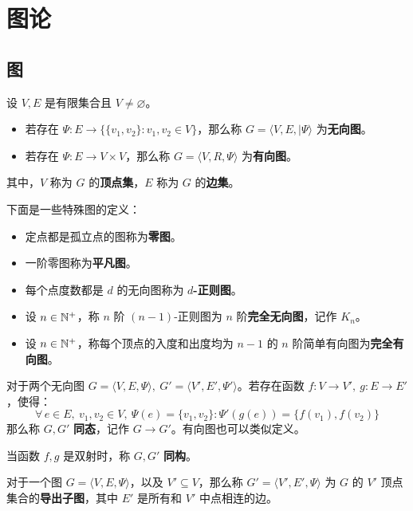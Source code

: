 \section{图论}

\subsection{图}

\begin{definition}[图]
    设 $V, E$ 是有限集合且 $V \neq \varnothing$。
    \begin{itemize}
        \item 若存在 $\Psi: E \to \{\{v_1, v_2\}: v_1, v_2 \in V\}$，那么称 $G = \langle V, E, |\Psi \rangle$ 为\textbf{无向图}。
        \item 若存在 $\Psi: E \to V \times V$，那么称 $G = \langle V, R, \Psi \rangle$ 为\textbf{有向图}。
    \end{itemize}
    其中，$V$ 称为 $G$ 的\textbf{顶点集}，$E$ 称为 $G$ 的\textbf{边集}。
\end{definition}

下面是一些特殊图的定义：

\begin{itemize}
    \item 定点都是孤立点的图称为\textbf{零图}。
    \item 一阶零图称为\textbf{平凡图}。
    \item 每个点度数都是 $d$ 的无向图称为 \textbf{$d$-正则图}。
    \item 设 $n \in \mathbb{N}^+$，称 $n$ 阶 $(n-1)$-正则图为 $n$ 阶\textbf{完全无向图}，记作 $K_n$。
    \item 设 $n \in \mathbb{N}^+$，称每个顶点的入度和出度均为 $n - 1$ 的 $n$ 阶简单有向图为\textbf{完全有向图}。
\end{itemize}

\begin{definition}[同态和同构]
    对于两个无向图 $G = \langle V, E, \Psi \rangle,\ G' = \langle V', E', \Psi' \rangle$。若存在函数 $f: V \to V',\ g: E \to E'$，使得：
    $$
    \forall\,e \in E,\ v_1, v_2 \in V,\ \Psi(e) = \{v_1, v_2\}: \Psi'(g(e)) = \{f(v_1), f(v_2)\}
    $$
    那么称 $G, G'$ \textbf{同态}，记作 $G \to G'$。有向图也可以类似定义。

    当函数 $f, g$ 是双射时，称 $G, G'$ \textbf{同构}。
\end{definition}

\begin{definition}[导出子图]
    对于一个图 $G = \langle V, E, \Psi \rangle$，以及 $V' \subseteq V$，那么称 $G' = \langle V', E', \Psi \rangle$ 为 $G$ 的 $V'$ 顶点集合的\textbf{导出子图}，其中 $E'$ 是所有和 $V'$ 中点相连的边。
\end{definition}
